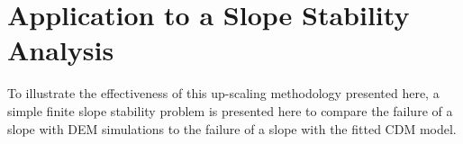 \section{Application to a Slope Stability Analysis}

To illustrate the effectiveness of this up-scaling methodology presented here, a simple finite slope stability problem is presented here to compare the failure of a slope with DEM simulations to the failure of a slope with the fitted CDM model. 
